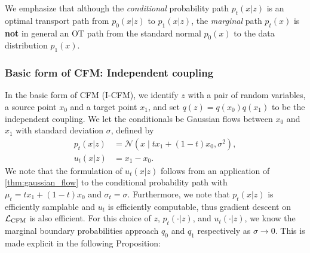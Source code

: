 \documentclass[10pt]{article}
\theoremstyle{plain}
\theoremstyle{definition}
\theoremstyle{remark}
\newcommand{\LCFM}[0]{\gL_{\rm CFM}}
\begin{document}
We emphasize that although the \emph{conditional} probability path $p_t(x|z)$ is an optimal transport path from $p_0(x|z)$ to $p_1(x|z)$, the \emph{marginal} path $p_t(x)$ is \textbf{not} in general an OT path from the standard normal $p_0(x)$ to the data distribution $p_1(x)$.

\subsubsection{Basic form of CFM: Independent coupling}\label{sec:pair_conditional_fm}

In the basic form of CFM (I-CFM), we identify $z$ with a pair of random variables, a source point $x_0$ and a target point $x_1$, and set $q(z)=q(x_0)q(x_1)$ to be the independent coupling. We let the conditionals be Gaussian flows between $x_0$ and $x_1$ with standard deviation $\sigma$, defined by
\begin{align}
p_t(x | z) &= \mathcal{N}(x\mid t x_1 + (1 - t) x_0, \sigma^2),\label{eq:cfm:pt}\\
u_t(x | z) &= x_1 - x_0. \label{eq:cfm:ut}
\end{align}
We note that the formulation of $u_t(x | z)$ follows from an application of \autoref{thm:gaussian_flow} to the conditional probability path with $\mu_t = t x_1 + (1 - t) x_0$ and $\sigma_t = \sigma$. Furthermore, we note that $p_t(x | z)$ is efficiently samplable and $u_t$ is efficiently computable, thus gradient descent on $\LCFM$ is also efficient. For this choice of $z$, $p_t(\cdot | z)$, and $u_t(\cdot | z)$, we know the marginal boundary probabilities approach $q_0$ and $q_1$ respectively as $\sigma \to 0$. This is made explicit in the following Proposition:
\end{document}
